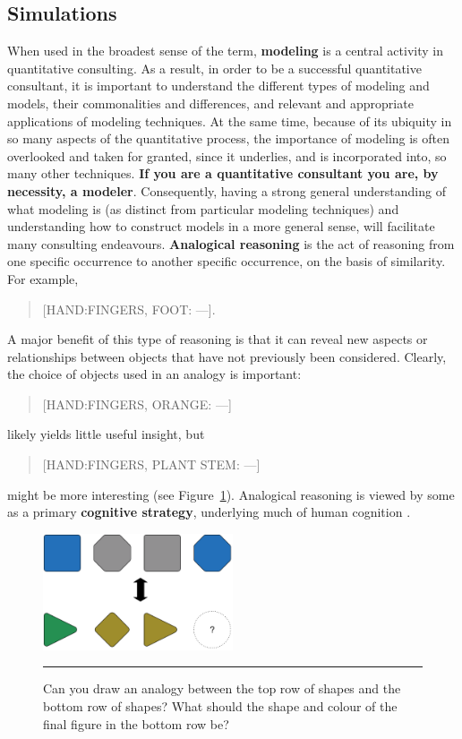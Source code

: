 \subsection{Simulations}
When used in the broadest sense of the term, \textbf{modeling} is a central activity in quantitative consulting. As a result, in order to be a successful quantitative consultant, it is important to understand the different types of modeling and models, their commonalities and differences, and relevant and appropriate applications of modeling techniques. At the same time, because of its ubiquity in so many aspects of the quantitative process, the importance of modeling is often overlooked and taken for granted, since it underlies, and is incorporated into, so many other techniques. \textbf{If you are a quantitative consultant you are, by necessity, a modeler}. Consequently, having a strong general understanding of what modeling is (as distinct from particular modeling techniques) and understanding how to construct models in a more general sense, will facilitate many consulting endeavours.
\newl \textbf{Analogical reasoning} is the act of reasoning from one specific occurrence to another specific occurrence, on the basis of similarity. For example, \begin{quote}[HAND:FINGERS, FOOT: ---].\end{quote} A major benefit of this type of reasoning is that it can reveal new aspects or relationships between objects that have not previously been considered. Clearly, the choice of objects used in an analogy is important: \begin{quote} [HAND:FINGERS, ORANGE: ---] \end{quote}
likely yields little useful insight, but 
\begin{quote}[HAND:FINGERS, PLANT STEM: ---] \end{quote}
might be more interesting (see Figure~\ref{simfig:1}). Analogical reasoning is viewed by some as a primary \textbf{cognitive strategy}, underlying much of human cognition \cite{SIM_HGK,SIM_H,SIM_C}.
\begin{figure}[!t]
	\centering
		\includegraphics[width=0.50\textwidth]{images/SIM/analogy_diagram.pdf}
	\caption[\small Example of analogical reasoning]{\small Can you draw an analogy between the top row of shapes and the bottom row of shapes? What should the shape and colour of the final figure in the bottom row be?}
	\label{simfig:1}\hrule
\end{figure}
